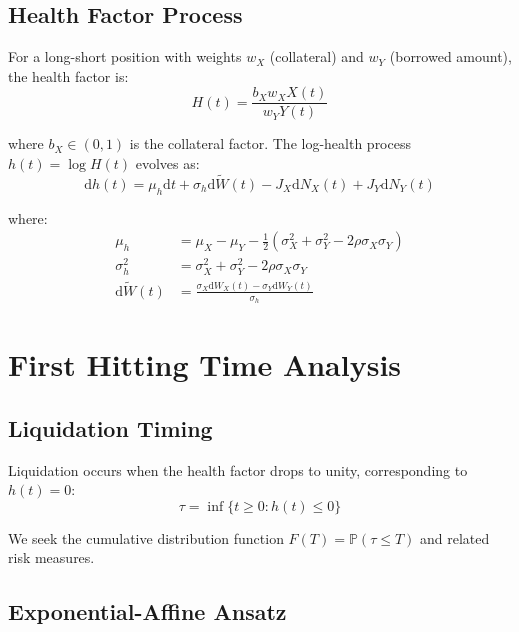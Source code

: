 \documentclass{article}
\renewcommand{\P}{\mathbb{P}}
\newcommand{\diff}{\mathrm{d}}
\theoremstyle{definition}
\begin{document}
\subsection{Health Factor Process}

For a long-short position with weights $w_X$ (collateral) and $w_Y$ (borrowed amount), the health factor is:
\begin{equation}
H(t) = \frac{b_X w_X X(t)}{w_Y Y(t)} \label{eq:health_factor}
\end{equation}

where $b_X \in (0,1)$ is the collateral factor. The log-health process $h(t) = \log H(t)$ evolves as:
\begin{equation}
\diff h(t) = \mu_h \diff t + \sigma_h \diff \tilde{W}(t) - J_X \diff N_X(t) + J_Y \diff N_Y(t) \label{eq:log_health}
\end{equation}

where:
\begin{align}
\mu_h &= \mu_X - \mu_Y - \frac{1}{2}(\sigma_X^2 + \sigma_Y^2 - 2\rho\sigma_X\sigma_Y) \\
\sigma_h^2 &= \sigma_X^2 + \sigma_Y^2 - 2\rho\sigma_X\sigma_Y \\
\diff \tilde{W}(t) &= \frac{\sigma_X \diff W_X(t) - \sigma_Y \diff W_Y(t)}{\sigma_h}
\end{align}

\section{First Hitting Time Analysis}

\subsection{Liquidation Timing}

Liquidation occurs when the health factor drops to unity, corresponding to $h(t) = 0$:
\begin{equation}
\tau = \inf\{t \geq 0 : h(t) \leq 0\} \label{eq:stopping_time}
\end{equation}

We seek the cumulative distribution function $F(T) = \P(\tau \leq T)$ and related risk measures.

\subsection{Exponential-Affine Ansatz}
\end{document}
